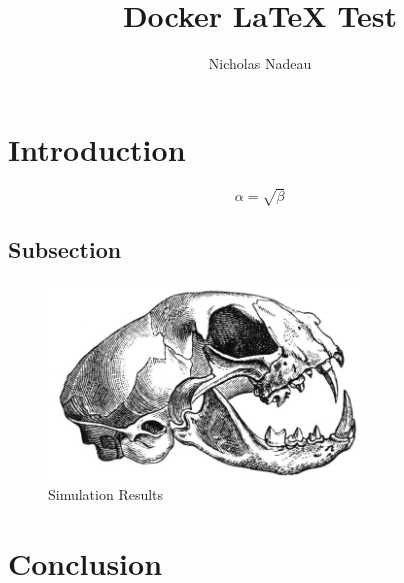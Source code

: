 \documentclass{article}
\begin{document}
\title{Docker \LaTeX{} Test}
\author{Nicholas Nadeau}

\maketitle

\begin{abstract}
\lipsum[1]
\end{abstract}

\section{Introduction}
\lipsum

\begin{equation}
    \label{simple_equation}
    \alpha = \sqrt{ \beta }
\end{equation}

\subsection{Subsection}
\lipsum[2-3]

\begin{figure}
    \centering
    \includegraphics[width=0.75\textwidth]{foo}
    \caption{Simulation Results}
    \label{simulationfigure}
\end{figure}

\section{Conclusion}
\lipsum[4-5]
\end{document}
